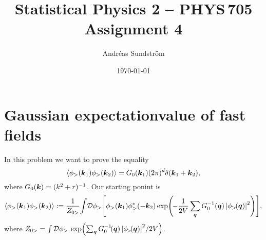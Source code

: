 \documentclass[11pt,letter, swedish, english
]{article}
\begin{document}




\title{Statistical Physics 2 -- PHYS\,705 \\
Assignment 4}
\author{Andréas Sundström}
\date{\today}

\maketitle


\section{Gaussian expectationvalue of fast fields}
In this problem we want to prove the equality
\begin{equation}\label{eq:1_want}
\ev{\phi_>(\vb*k_1)\phi_>(\vb*k_2)}
= G_0(\vb*k_1) (2\pi)^d \delta(\vb*k_1+\vb*k_2),
\end{equation}
where $G_0(\vb*k) = (k^2+r)^{-1}$. Our starting ponint is
\begin{equation}\label{eq:1_start}
\ev{\phi_>(\vb*k_1)\phi_>(\vb*k_2)}
:= \frac{1}{Z_{0>}}\! \int\!\mathcal{D}\phi_> 
\qty[\phi_>(\vb*k_1)\phi_>^*(-\vb*k_2)
\exp(\!{-}\frac{1}{2V}\sum_{\vb*q}G_0^{-1}(\vb*q)\,
\qty|\phi_{>}\!(\vb*q)|^2
)],
\end{equation}
where $Z_{0>} = \int\mathcal{D}\phi_>\,
\exp(\sum_{\vb*q}G_0^{-1}\!(\vb*q)\,
\qty|\phi_{\!>}\!(\vb*q)|^2/2V)$.
\end{document}
